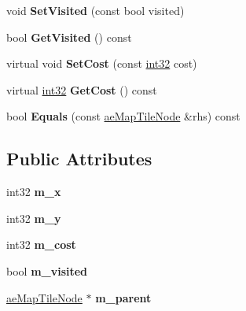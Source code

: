 \begin{DoxyCompactItemize}
\item 
void {\bfseries Set\+Visited} (const bool visited)\hypertarget{classae_map_tile_node_a3d795d12dfca638d69352ee31265e7ef}{}\label{classae_map_tile_node_a3d795d12dfca638d69352ee31265e7ef}

\item 
bool {\bfseries Get\+Visited} () const \hypertarget{classae_map_tile_node_a243689baa5ecef13f46f8ed3e797e772}{}\label{classae_map_tile_node_a243689baa5ecef13f46f8ed3e797e772}

\item 
virtual void {\bfseries Set\+Cost} (const \hyperlink{namespaceae_core_a862bc39eb87cfabca273f49e2a920129}{int32} cost)\hypertarget{classae_map_tile_node_a076c949c338a01d53d6496c375fadd9b}{}\label{classae_map_tile_node_a076c949c338a01d53d6496c375fadd9b}

\item 
virtual \hyperlink{namespaceae_core_a862bc39eb87cfabca273f49e2a920129}{int32} {\bfseries Get\+Cost} () const \hypertarget{classae_map_tile_node_a31b806242d821f4ce62174094858b659}{}\label{classae_map_tile_node_a31b806242d821f4ce62174094858b659}

\item 
bool {\bfseries Equals} (const \hyperlink{classae_map_tile_node}{ae\+Map\+Tile\+Node} \&rhs) const \hypertarget{classae_map_tile_node_a472307fed8aac17c894eabbccdee6e9e}{}\label{classae_map_tile_node_a472307fed8aac17c894eabbccdee6e9e}

\end{DoxyCompactItemize}
\subsection*{Public Attributes}
\begin{DoxyCompactItemize}
\item 
int32 {\bfseries m\+\_\+x}\hypertarget{classae_map_tile_node_a570f1e8a2a2b66e90f514935ec155d76}{}\label{classae_map_tile_node_a570f1e8a2a2b66e90f514935ec155d76}

\item 
int32 {\bfseries m\+\_\+y}\hypertarget{classae_map_tile_node_acd2a5abd41dff0834271fa9c83c7e857}{}\label{classae_map_tile_node_acd2a5abd41dff0834271fa9c83c7e857}

\item 
int32 {\bfseries m\+\_\+cost}\hypertarget{classae_map_tile_node_a63625c9702e0380960791a7033803e33}{}\label{classae_map_tile_node_a63625c9702e0380960791a7033803e33}

\item 
bool {\bfseries m\+\_\+visited}\hypertarget{classae_map_tile_node_af0ad3f1b0e3cb5309323ee59c60c668e}{}\label{classae_map_tile_node_af0ad3f1b0e3cb5309323ee59c60c668e}

\item 
\hyperlink{classae_map_tile_node}{ae\+Map\+Tile\+Node} $\ast$ {\bfseries m\+\_\+parent}\hypertarget{classae_map_tile_node_ad53935b025ed63a79b92d14578ec257e}{}\label{classae_map_tile_node_ad53935b025ed63a79b92d14578ec257e}

\end{DoxyCompactItemize}


